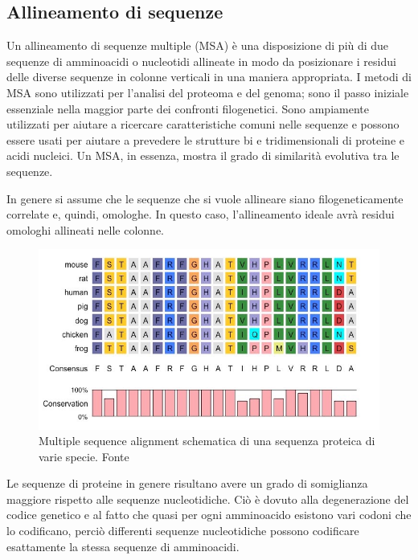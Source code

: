 \subsection{Allineamento di sequenze} \label{sec:MSA}
{
	Un allineamento di sequenze multiple (MSA) è una disposizione di più di due sequenze di amminoacidi o nucleotidi allineate in modo da posizionare i residui delle diverse sequenze in colonne verticali in una maniera appropriata. I metodi di MSA sono utilizzati per l'analisi del proteoma e del genoma; sono il passo iniziale essenziale nella maggior parte dei confronti filogenetici. Sono ampiamente utilizzati per aiutare a ricercare caratteristiche comuni nelle sequenze e possono essere usati per aiutare a prevedere le strutture bi e tridimensionali di proteine e acidi nucleici. Un MSA, in essenza, mostra il grado di similarità evolutiva tra le sequenze. 
	
	\par In genere si assume che le sequenze che si vuole allineare siano filogeneticamente correlate e, quindi, omologhe. In questo caso, l'allineamento ideale avrà residui omologhi allineati nelle colonne.
	
	\begin{figure}[!htb]
		\centering
		\includegraphics[scale=0.5]{images/msa.jpeg}
		\caption{Multiple sequence alignment schematica di una sequenza proteica di varie specie. Fonte\cite{msaBioNinja}}
		\label{fig:msa}
	\end{figure}
	
	\par Le sequenze di proteine in genere risultano avere un grado di somiglianza maggiore rispetto alle sequenze nucleotidiche. Ciò è dovuto alla degenerazione del codice genetico e al fatto che quasi per ogni amminoacido esistono vari codoni che lo codificano, perciò differenti sequenze nucleotidiche possono codificare esattamente la stessa sequenze di amminoacidi.
	
}
